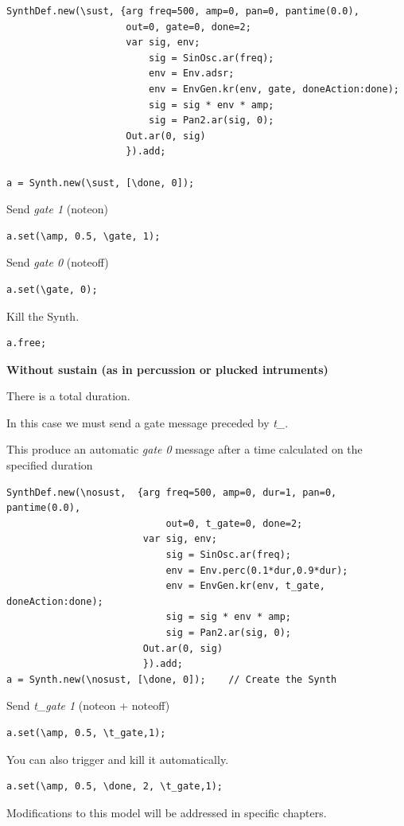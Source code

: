 \begin{lstlisting}[frame=single, caption=Instrument model with sustain] 
SynthDef.new(\sust, {arg freq=500, amp=0, pan=0, pantime(0.0), 
                     out=0, gate=0, done=2;
                     var sig, env;
                         sig = SinOsc.ar(freq);
                         env = Env.adsr;         
                         env = EnvGen.kr(env, gate, doneAction:done);
                         sig = sig * env * amp;
                         sig = Pan2.ar(sig, 0);
                     Out.ar(0, sig)
                     }).add;       
                                                
a = Synth.new(\sust, [\done, 0]); 
\end{lstlisting}
Send \textit{gate 1} (noteon)
\begin{lstlisting}[frame=single] 
a.set(\amp, 0.5, \gate, 1);
\end{lstlisting}
Send \textit{gate 0} (noteoff)
\begin{lstlisting}[frame=single] 
a.set(\gate, 0);
\end{lstlisting}
Kill the Synth.
\begin{lstlisting}[frame=single] 
a.free;
\end{lstlisting}

\textbf{Without sustain (as in percussion or plucked intruments)}

There is a total duration.

In this case we must send a gate message preceded by \textit{t\_}.

This produce an automatic \textit{gate 0} message after a time calculated on the specified duration

\begin{lstlisting}[frame=single, caption=Instrument model without sustain] 
SynthDef.new(\nosust,  {arg freq=500, amp=0, dur=1, pan=0, pantime(0.0), 
                            out=0, t_gate=0, done=2;
                        var sig, env;
                            sig = SinOsc.ar(freq);
                            env = Env.perc(0.1*dur,0.9*dur);                     
                            env = EnvGen.kr(env, t_gate, doneAction:done);
                            sig = sig * env * amp;
                            sig = Pan2.ar(sig, 0);
                        Out.ar(0, sig)
                        }).add;                                                   
a = Synth.new(\nosust, [\done, 0]);    // Create the Synth
\end{lstlisting}

Send \textit{t\_gate 1} (noteon + noteoff)

\begin{lstlisting}[frame=single] 
a.set(\amp, 0.5, \t_gate,1);
\end{lstlisting}

You can also trigger and kill it automatically.

\begin{lstlisting}[frame=single] 
a.set(\amp, 0.5, \done, 2, \t_gate,1);
\end{lstlisting}

Modifications to this model will be addressed in specific chapters.